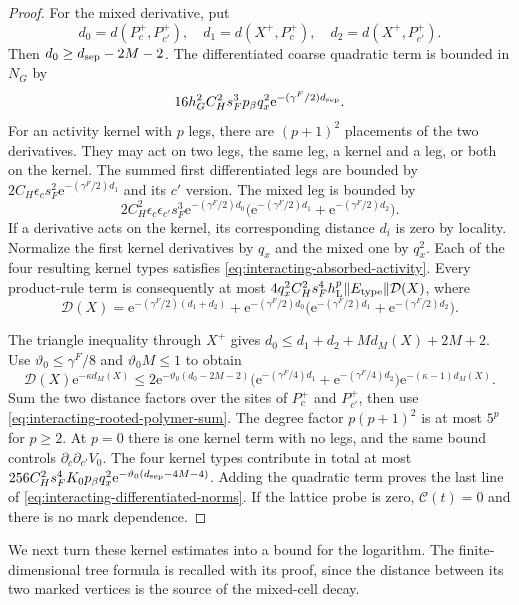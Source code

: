 \documentclass[11pt,letterpaper,reqno]{amsart}
\begin{document}
\begin{proof}
For the mixed derivative, put
\[
 d_0=d(P_c^+,P_{c'}^+),\quad
 d_1=d(X^+,P_c^+),\quad d_2=d(X^+,P_{c'}^+).
\]
Then $d_0\ge d_{\rm sep}-2M-2$.
The differentiated coarse quadratic term is
bounded in $N_G$ by
\[
 16h_G^2C_H^2s_F^3p_\beta q_x^2
                                      \mathrm e^{-(\gamma^F/2)d_{\rm sep}}.
\]
For an activity kernel with $p$ legs, there
are $(p+1)^2$ placements of the two derivatives.
They may act on two legs, the same leg, a
kernel and a leg, or both on the kernel.
The summed first differentiated legs are
bounded by $2C_H\epsilon_cs_F^2\mathrm e^{-(\gamma^F/2)d_1}$
and its $c'$ version. The mixed leg is
bounded by
\[
 2C_H^2\epsilon_c\epsilon_{c'}s_F^3\mathrm e^{-(\gamma^F/2)d_0}
       \bigl(\mathrm e^{-(\gamma^F/2)d_1}+\mathrm e^{-(\gamma^F/2)d_2}\bigr).
\]
If a derivative acts on the kernel, its
corresponding distance $d_i$ is zero by
locality. Normalize the first kernel
derivatives by $q_x$ and the mixed one by
$q_x^2$. Each of the four resulting kernel
types satisfies \eqref{eq:interacting-absorbed-activity}.
Every product-rule term is consequently at most
$4q_x^2C_H^2s_F^4h_{\rm L}^p\|E_{\rm type}\|\mathcal D(X)$,
where
\[
 \mathcal D(X)=\mathrm e^{-(\gamma^F/2)(d_1+d_2)}
       +\mathrm e^{-(\gamma^F/2)d_0}
                  \bigl(\mathrm e^{-(\gamma^F/2)d_1}+\mathrm e^{-(\gamma^F/2)d_2}\bigr).
\]

The triangle inequality through $X^+$ gives
$d_0\le d_1+d_2+M d_M(X)+2M+2$.
Use $\vartheta_0\le\gamma^F/8$ and
$\vartheta_0M\le1$ to obtain
\[
 \mathcal D(X)\mathrm e^{-\kappa d_M(X)}
 \le2\mathrm e^{-\vartheta_0(d_0-2M-2)}
       \bigl(\mathrm e^{-(\gamma^F/4)d_1}+\mathrm e^{-(\gamma^F/4)d_2}\bigr)
                                \mathrm e^{-(\kappa-1)d_M(X)}.
\]
Sum the two distance factors over the sites
of $P_c^+$ and $P_{c'}^+$, then use
\eqref{eq:interacting-rooted-polymer-sum}.
The degree factor $p(p+1)^2$ is at most
$5^p$ for $p\ge2$. At $p=0$ there is
one kernel term with no legs, and the same
bound controls $\partial_c\partial_{c'}V_0$.
The four kernel types contribute in total
at most
$256C_H^2s_F^4K_0p_\beta q_x^2
\mathrm e^{-\vartheta_0(d_{\rm sep}-4M-4)}$.
Adding the quadratic term proves the last
line of \eqref{eq:interacting-differentiated-norms}.
If the lattice probe is zero, $\mathscr C(t)=0$
and there is no mark dependence.
\end{proof}

We next turn these kernel estimates into a bound
for the logarithm. The finite-dimensional tree
formula is recalled with its proof, since the
distance between its two marked vertices is
the source of the mixed-cell decay.
\end{document}
